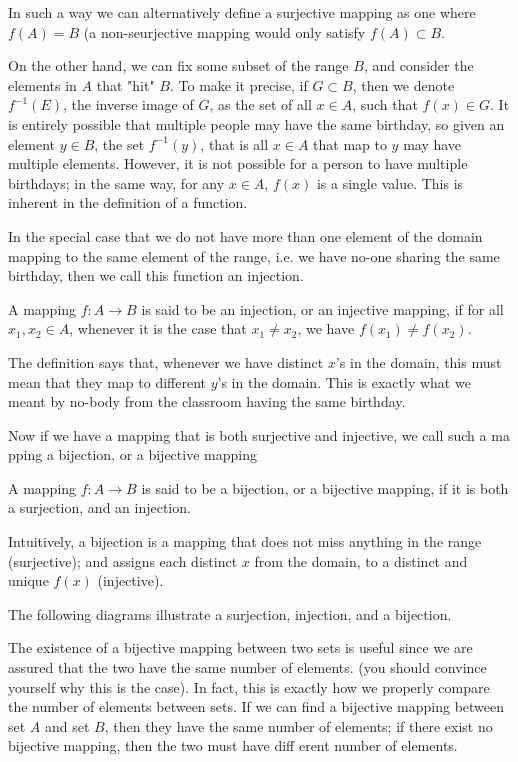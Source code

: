 \documentclass[../../templates/section]{subfiles}
\begin{document}
In such a way we can alternatively define
a surjective mapping as one where $f(A) = B$ (a non-seurjective mapping would
only satisfy $f(A) \subset B$.

On the other hand, we can fix some subset of the range $B$, and consider the 
elements in $A$ that "hit" $B$. To make it precise, if $G \subset B$, then we
denote $f^{-1}(E)$, the inverse image of $G$, as the set of all $x\in A$, such
that $f(x)\in G$. It is entirely possible that multiple people may have the
same birthday, so given an element $y\in B$, the set $f^{-1}(y)$, that is all 
$x\in A$ that map to $y$ may have multiple elements. However, it is not
possible for a person to have multiple birthdays; in the same way, for any
$x\in A$, $f(x)$ is a single value. This is inherent in the definition of a
function.

In the special case that we do not have more than one element of the domain 
mapping to the same element of the range, i.e. we have no-one sharing the same
birthday, then we call this function an injection.

\begin{definition}
A mapping $f:A\rightarrow B$ is said to be an injection, or an injective
mapping, if for all $x_1, x_2 \in A$, whenever it is the case that
$x_1\neq x_2$, we have $f(x_1) \neq f(x_2)$.
\end{definition}

The definition says that, whenever we have distinct $x$'s in the domain, this must
mean that they map to different $y$'s in the domain. This is exactly what we meant
by no-body from the classroom having the same birthday.

Now if we have a mapping that is both surjective and injective, we call such a ma
pping a bijection, or a bijective mapping

\begin{definition}
A mapping $f:A\rightarrow B$ is said to be a bijection, or a bijective mapping, if
it is both a surjection, and an injection.
\end{definition} 

Intuitively, a bijection is a mapping that does not miss anything in the range 
(surjective); and assigns each distinct $x$ from the domain, to a distinct and 
unique $f(x)$ (injective). 

The following diagrams illustrate a surjection, injection, and a bijection.

The existence of a bijective mapping between two sets is useful since we are 
assured that the two have the same number of elements. 
(you should convince yourself why this is the case). In fact, this is exactly 
how we properly compare the number of elements between sets. If we can find a 
bijective mapping between set $A$ and set $B$, then they have the same number 
of elements; if there exist no bijective mapping, then the two must have diff
erent number of elements. 
\end{document}
